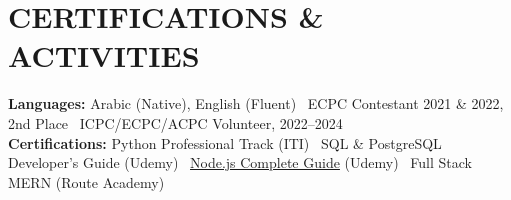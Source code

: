 \section*{CERTIFICATIONS \& ACTIVITIES}
{\footnotesize \textbf{Languages:} Arabic (Native), English (Fluent) \textbar\ ECPC Contestant 2021 \& 2022, 2nd Place \textbar\ ICPC/ECPC/ACPC Volunteer, 2022--2024\\[0.15em]
\textbf{Certifications:} Python Professional Track (ITI) \textbar\ SQL \& PostgreSQL Developer's Guide (Udemy) \textbar\ \href{https://udemy-certificate.s3.amazonaws.com/image/UC-1915f7c1-c6fd-4351-8bf8-b6525184ef80.jpg?v=1782043676000}{Node.js Complete Guide} (Udemy) \textbar\ Full Stack MERN (Route Academy)}
